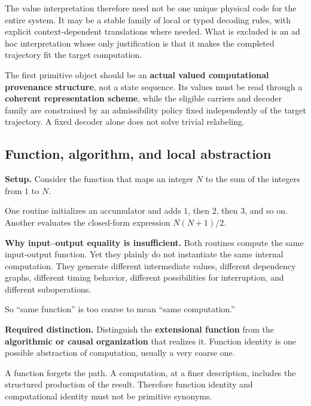 \documentclass[11pt,a4paper]{article}
\newcounter{thought}
\newenvironment{thoughtbox}[1]{%
  \refstepcounter{thought}%
  \begin{tcolorbox}[
    enhanced,breakable,
    colback=white,colframe=navy,boxrule=0.85pt,
    arc=1.7mm,left=2.8mm,right=2.8mm,top=2.2mm,bottom=2.0mm,
    borderline west={2.2pt}{0pt}{blue},
    title={\large\bfseries Thought experiment \thethought: #1},
    fonttitle=\bfseries,coltitle=navy,
    attach boxed title to top left={xshift=2mm,yshift=-2mm},
    boxed title style={colback=sky,colframe=blue,boxrule=0.55pt,arc=1.2mm},
    before skip=9pt,after skip=10pt
  ]
}{\end{tcolorbox}}
\newcommand{\scene}{\medskip\textbf{Setup.} }
\begin{document}
\begin{thoughtbox}{Why a state sequence is too weak}
The value interpretation therefore need not be one unique physical code for the entire system. It may be a stable family of local or typed decoding rules, with explicit context-dependent translations where needed. What is excluded is an ad hoc interpretation whose only justification is that it makes the completed trajectory fit the target computation.

\begin{conceptbox}
The first primitive object should be an \textbf{actual valued computational provenance structure}, not a state sequence. Its values must be read through a \textbf{coherent representation scheme}, while the eligible carriers and decoder family are constrained by an admissibility policy fixed independently of the target trajectory. A fixed decoder alone does not solve trivial relabeling.
\end{conceptbox}
\end{thoughtbox}

\subsection{Function, algorithm, and local abstraction}

\begin{thoughtbox}{The same function, two different computations}
\scene Consider the function that maps an integer $N$ to the sum of the integers from $1$ to $N$.

One routine initializes an accumulator and adds $1$, then $2$, then $3$, and so on. Another evaluates the closed-form expression $N(N+1)/2$.

\medskip\textbf{Why input--output equality is insufficient.} Both routines compute the same input-output function. Yet they plainly do not instantiate the same internal computation. They generate different intermediate values, different dependency graphs, different timing behavior, different possibilities for interruption, and different suboperations.

So ``same function'' is too coarse to mean ``same computation.''

\medskip\textbf{Required distinction.} Distinguish the \textbf{extensional function} from the \textbf{algorithmic or causal organization} that realizes it. Function identity is one possible abstraction of computation, usually a very coarse one.

\begin{conceptbox}
A function forgets the path. A computation, at a finer description, includes the structured production of the result. Therefore function identity and computational identity must not be primitive synonyms.
\end{conceptbox}
\end{thoughtbox}
\end{document}
